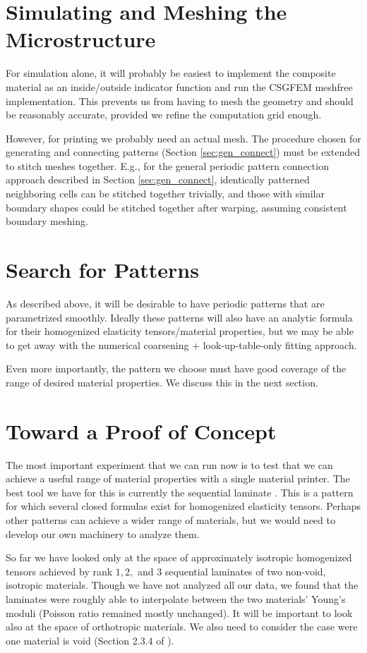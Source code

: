 \documentclass[10pt]{article}
\begin{document}
\section{Simulating and Meshing the Microstructure}
For simulation alone, it will probably be easiest to implement the composite
material as an inside/outside indicator function and run the CSGFEM meshfree
implementation. This prevents us from having to mesh the geometry and should be
reasonably accurate, provided we refine the computation grid enough.

However, for printing we probably need an actual mesh. The procedure chosen for
generating and connecting patterns (Section \ref{sec:gen_connect}) must be
extended to stitch meshes together. E.g., for the general periodic pattern
connection approach described in Section \ref{sec:gen_connect}, identically
patterned neighboring cells can be stitched together trivially, and those with
similar boundary shapes could be stitched together after warping, assuming
consistent boundary meshing.

\section{Search for Patterns}
As described above, it will be desirable to have periodic patterns that are
parametrized smoothly. Ideally these patterns will also have an analytic formula
for their homogenized elasticity tensors/material properties,
but we may be able to get away with the numerical coarsening +
look-up-table-only fitting approach.

Even more importantly, the pattern we choose must have good coverage of the
range of desired material properties. We discuss this in the next section.

\section{Toward a Proof of Concept}
The most important experiment that we can run now is to test that we can achieve
a useful range of material properties with a single material printer. The best
tool we have for this is currently the sequential laminate
\cite{allaire2002shape}. This is a pattern for which several closed formulas
exist for homogenized elasticity tensors. Perhaps other patterns can achieve a
wider range of materials, but we would need to develop our own machinery to
analyze them.

So far we have looked only at the space of approximately isotropic homogenized
tensors achieved by rank $1, 2, $ and $3$ sequential laminates of two
non-void, isotropic materials. Though we have not analyzed all our data, we
found that the laminates were roughly able to interpolate between the two
materials' Young's moduli (Poisson ratio remained mostly unchanged). It will be
important to look also at the space of orthotropic materials. We also need to
consider the case were one material is void (Section 2.3.4 of
\cite{allaire2002shape}).
\end{document}
